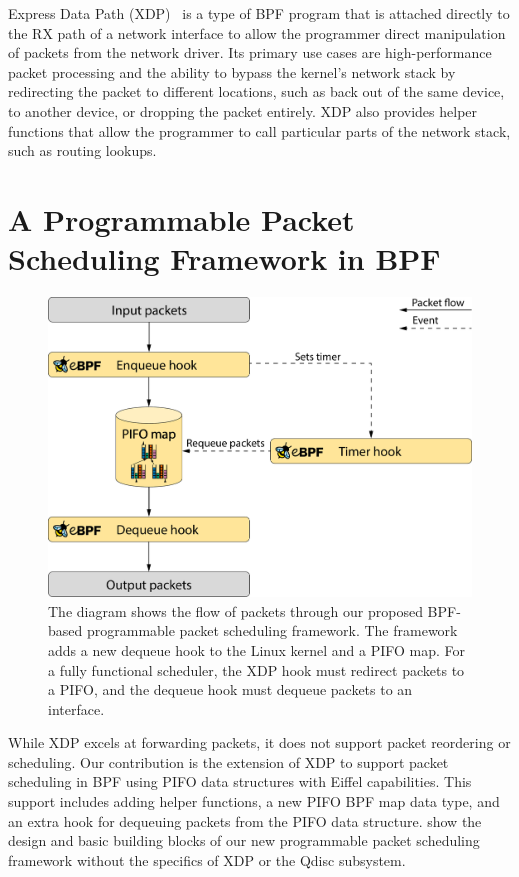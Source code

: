 \documentclass[sigconf, nonacm]{acmart}
\begin{document}
Express Data Path (XDP)~\cite{hoiland2018express} is a type of BPF program that is attached directly to the RX path of a network interface to allow the programmer direct manipulation of packets from the network driver. Its primary use cases are high-performance packet processing and the ability to bypass the kernel's network stack by redirecting the packet to different locations, such as back out of the same device, to another device, or dropping the packet entirely. XDP also provides helper functions that allow the programmer to call particular parts of the network stack, such as routing lookups.

\section{A Programmable Packet Scheduling Framework in BPF}

\begin{figure}

  \includegraphics[width=\linewidth]{bpf_pps_flow.pdf}

  \caption{The diagram shows the flow of packets through our proposed BPF-based programmable packet scheduling framework. The framework adds a new dequeue hook to the Linux kernel and a PIFO map. For a fully functional scheduler, the XDP hook must redirect packets to a PIFO, and the dequeue hook must dequeue packets to an interface.}
  \label{fig:bpf_pps_flow}
\end{figure}

While XDP excels at forwarding packets, it does not support packet reordering or scheduling. Our contribution is the extension of XDP to support packet scheduling in BPF using PIFO data structures with Eiffel capabilities. This support includes adding helper functions, a new PIFO BPF map data type, and an extra hook for dequeuing packets from the PIFO data structure.  show the design and basic building blocks of our new programmable packet scheduling framework without the specifics of XDP or the Qdisc subsystem.
\end{document}
